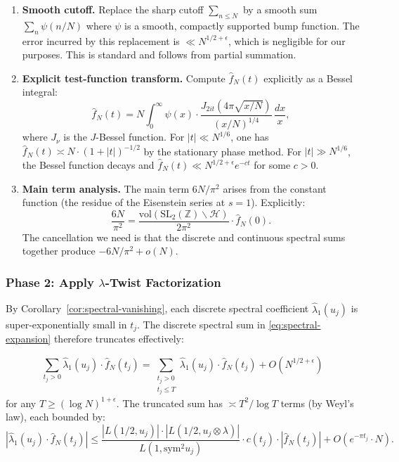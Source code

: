 \documentclass[11pt,a4paper]{article}
\theoremstyle{plain}
\theoremstyle{definition}
\newcommand{\sym}{\mathrm{sym}}
\newcommand{\SL}{\mathrm{SL}}
\newcommand{\vol}{\mathrm{vol}}
\newcommand{\ZZ}{\mathbb{Z}}
\newcommand{\cH}{\mathcal{H}}
\begin{document}
\begin{enumerate}[label=\textbf{P1.\arabic*:}]
\item \textbf{Smooth cutoff.} Replace the sharp cutoff $\sum_{n \leq N}$ by a smooth sum $\sum_{n} \psi(n/N)$ where $\psi$ is a smooth, compactly supported bump function. The error incurred by this replacement is $\ll N^{1/2+\epsilon}$, which is negligible for our purposes. This is standard and follows from partial summation.

\item \textbf{Explicit test-function transform.} Compute $\hat{f}_N(t)$ explicitly as a Bessel integral:
\[
\hat{f}_N(t) = N \int_0^\infty \psi(x) \cdot \frac{J_{2it}(4\pi\sqrt{x/N})}{(x/N)^{1/4}} \, \frac{dx}{x},
\]
where $J_\nu$ is the $J$-Bessel function. For $|t| \ll N^{1/6}$, one has $\hat{f}_N(t) \asymp N \cdot (1+|t|)^{-1/2}$ by the stationary phase method. For $|t| \gg N^{1/6}$, the Bessel function decays and $\hat{f}_N(t) \ll N^{1/2+\epsilon} e^{-c t}$ for some $c > 0$.

\item \textbf{Main term analysis.} The main term $6N/\pi^2$ arises from the constant function (the residue of the Eisenstein series at $s = 1$). Explicitly:
\[
\frac{6N}{\pi^2} = \frac{\vol(\SL_2(\ZZ)\backslash \cH)}{2\pi^2} \cdot \hat{f}_N(0).
\]
The cancellation we need is that the discrete and continuous spectral sums together produce $-6N/\pi^2 + o(N)$.
\end{enumerate}

\subsubsection{Phase 2: Apply $\lambda$-Twist Factorization}

By Corollary~\ref{cor:spectral-vanishing}, each discrete spectral coefficient $\hat{\lambda}_1(u_j)$ is super-exponentially small in $t_j$. The discrete spectral sum in \eqref{eq:spectral-expansion} therefore truncates effectively:

\begin{equation}
\label{eq:discrete-truncation}
\sum_{t_j > 0} \hat{\lambda}_1(u_j) \cdot \hat{f}_N(t_j) = \sum_{\substack{t_j > 0 \\ t_j \leq T}} \hat{\lambda}_1(u_j) \cdot \hat{f}_N(t_j) + O(N^{1/2+\epsilon})
\end{equation}
for any $T \geq (\log N)^{1+\epsilon}$. The truncated sum has $\asymp T^2 / \log T$ terms (by Weyl's law), each bounded by:
\[
|\hat{\lambda}_1(u_j) \cdot \hat{f}_N(t_j)| \leq \frac{|L(1/2, u_j)| \cdot |L(1/2, u_j \otimes \lambda)|}{L(1, \sym^2 u_j)} \cdot c(t_j) \cdot |\hat{f}_N(t_j)| + O(e^{-\pi t_j} \cdot N).
\]
\end{document}

